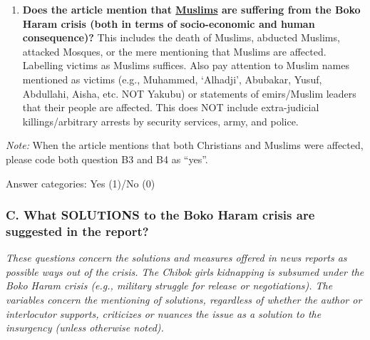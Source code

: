 \begin{enumerate}[noitemsep, font=\bfseries]
    \item \textbf{Does the article mention that \underline{Muslims} are suffering from the Boko Haram crisis (both in terms of socio-economic and human consequence)?} This includes the death of Muslims, abducted Muslims, attacked Mosques, or the mere mentioning that Muslims are affected. Labelling victims as Muslims suffices. Also pay attention to Muslim names mentioned as victims (e.g., Muhammed, ‘Alhadji’, Abubakar, Yusuf, Abdullahi, Aisha, etc. NOT Yakubu) or statements of emirs/Muslim leaders that their people are affected. This does NOT include extra-judicial killings/arbitrary arrests by security services, army, and police.
\end{enumerate}

\noindent \textit{Note:} When the article mentions that both Christians and Muslims were affected, please code both question B3 and B4 as “yes”.

\vspace{3mm}
\noindent Answer categories: Yes (1)/No (0)

\subsubsection{C.	What SOLUTIONS to the Boko Haram crisis are suggested in the report?}


\textit{These questions concern the solutions and measures offered in news reports as possible ways out of the crisis. The Chibok girls kidnapping is subsumed under the Boko Haram crisis (e.g., military struggle for release or negotiations). The variables concern the mentioning of solutions, regardless of whether the author or interlocutor supports, criticizes or nuances the issue as a solution to the insurgency (unless otherwise noted).}

